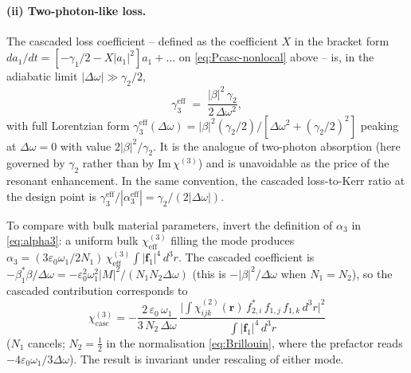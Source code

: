 \documentclass[11pt,a4paper]{article}
\newcommand{\eps}{\varepsilon}
\newcommand{\bvec}[1]{\mathbf{#1}}
\newcommand{\f}{\bvec{f}}
\newcommand{\ri}{\bvec{r}}
\newcommand{\dthreer}{\,d^{3}r}
\newcommand{\chitwo}{\chi^{(2)}}
\newcommand{\chithree}{\chi^{(3)}}
\newcommand{\Dom}{\Delta\omega}
\begin{document}
\paragraph{(ii) Two-photon-like loss.}
The cascaded loss coefficient -- defined as the coefficient $X$ in the
bracket form $da_1/dt = [-\gamma_1/2 - X|a_1|^{2}]a_1 + \ldots$ on
\eqref{eq:Pcasc-nonlocal} above -- is, in the adiabatic limit
$|\Dom|\gg\gamma_2/2$,
\begin{equation}
  \gamma_3^\text{eff}\;=\;\frac{|\beta|^{2}\,\gamma_2}{2\,\Dom^{2}},
  \label{eq:gamma3-adiab}
\end{equation}
with full Lorentzian form
$\gamma_3^\text{eff}(\Dom)=|\beta|^{2}(\gamma_2/2)/[\Dom^{2}+(\gamma_2/2)^{2}]$
peaking at $\Dom=0$ with value $2|\beta|^{2}/\gamma_2$.  It is the
analogue of two-photon absorption (here governed by $\gamma_2$ rather
than by $\mathrm{Im}\,\chithree$) and is unavoidable as the price of
the resonant enhancement.  In the same convention, the cascaded
loss-to-Kerr ratio at the design point is
$\gamma_3^\text{eff}/|\alpha_3^\text{eff}|=\gamma_2/(2|\Dom|)$.

\bigskip

To compare with bulk material parameters, invert the definition of
$\alpha_3$ in \eqref{eq:alpha3}: a uniform bulk $\chithree_{\text{eff}}$
filling the mode produces
$\alpha_3=(3\eps_0\omega_1/2N_1)\,\chithree_{\text{eff}}\!\int\!|\f_1|^4\dthreer$.
The cascaded coefficient is $-\beta_1^*\beta/\Dom
=-\eps_0^2\omega_1^2|M|^2/(N_1N_2\Dom)$ (this is $-|\beta|^2/\Dom$ when
$N_1=N_2$), so the cascaded contribution corresponds to
\begin{equation}
  \boxed{\;\chithree_{\text{casc}}=-\frac{2\,\eps_0\,\omega_1}{3\,N_2\,\Dom}\,
       \frac{\bigl|\!\int\!\chitwo_{ijk}(\ri)\,f_{2,i}^*\,f_{1,j}\,f_{1,k}\dthreer\bigr|^{2}}
            {\int|\f_1|^4\dthreer}\;}
\label{eq:chi3casc}
\end{equation}
($N_1$ cancels; $N_2=\tfrac12$ in the normalisation \eqref{eq:Brillouin},
where the prefactor reads $-4\eps_0\omega_1/3\Dom$).  The result is
invariant under rescaling of either mode.
\end{document}
